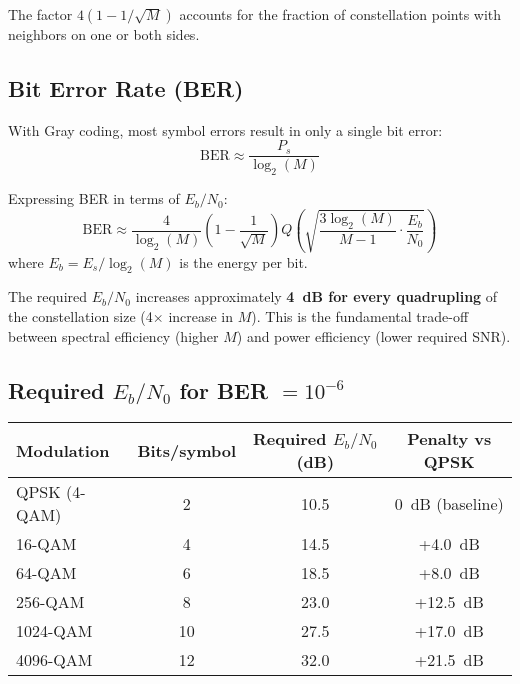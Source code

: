 The factor $4(1 - 1/\sqrt{M})$ accounts for the fraction of constellation points with neighbors on one or both sides.

\subsection{Bit Error Rate (BER)}

With Gray coding, most symbol errors result in only a single bit error:
\begin{equation}
\mathrm{BER} \approx \frac{P_s}{\log_2(M)}
\label{eq:qam-ber-ser}
\end{equation}

Expressing BER in terms of $E_b/N_0$:
\begin{equation}
\mathrm{BER} \approx \frac{4}{\log_2(M)}\left(1 - \frac{1}{\sqrt{M}}\right) Q\left(\sqrt{\frac{3\log_2(M)}{M-1} \cdot \frac{E_b}{N_0}}\right)
\label{eq:qam-ber}
\end{equation}
where $E_b = E_s/\log_2(M)$ is the energy per bit.

\begin{keyconcept}
The required $E_b/N_0$ increases approximately \textbf{4~dB for every quadrupling} of the constellation size (4$\times$ increase in $M$). This is the fundamental trade-off between spectral efficiency (higher $M$) and power efficiency (lower required SNR).
\end{keyconcept}

\subsection{Required $E_b/N_0$ for BER $= 10^{-6}$}

\begin{center}
\begin{tabular}{@{}lccc@{}}
\toprule
Modulation & Bits/symbol & Required $E_b/N_0$ (dB) & Penalty vs QPSK \\
\midrule
QPSK (4-QAM) & 2 & 10.5 & 0~dB (baseline) \\
16-QAM & 4 & 14.5 & +4.0~dB \\
64-QAM & 6 & 18.5 & +8.0~dB \\
256-QAM & 8 & 23.0 & +12.5~dB \\
1024-QAM & 10 & 27.5 & +17.0~dB \\
4096-QAM & 12 & 32.0 & +21.5~dB \\
\bottomrule
\end{tabular}
\end{center}

